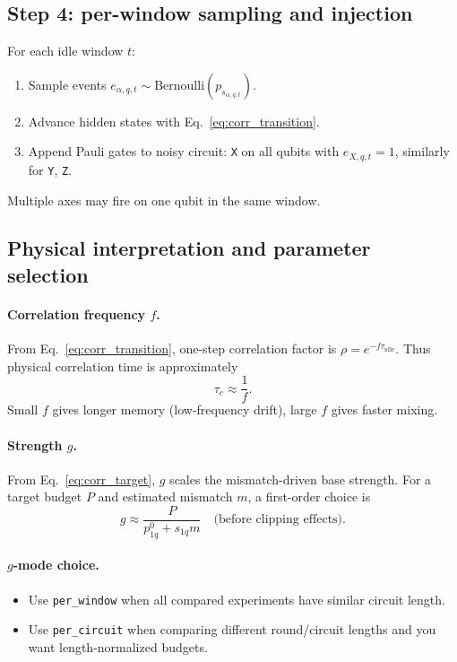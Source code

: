 \documentclass[11pt]{article}
\begin{document}
\subsection{Step 4: per-window sampling and injection}
For each idle window $t$:
\begin{enumerate}[label=\textbf{H\arabic*}.]
\item Sample events
$e_{\alpha,q,t}\sim \mathrm{Bernoulli}(p_{s_{\alpha,q,t}})$.
\item Advance hidden states with Eq.~\eqref{eq:corr_transition}.
\item Append Pauli gates to noisy circuit:
\texttt{X} on all qubits with $e_{X,q,t}=1$, similarly for \texttt{Y}, \texttt{Z}.
\end{enumerate}
Multiple axes may fire on one qubit in the same window.

\subsection{Physical interpretation and parameter selection}
\paragraph{Correlation frequency $f$.}
From Eq.~\eqref{eq:corr_transition}, one-step correlation factor is
$\rho=e^{-f\tau_{\mathrm{idle}}}$.
Thus physical correlation time is approximately
\begin{equation}
\tau_c\approx \frac{1}{f}.
\end{equation}
Small $f$ gives longer memory (low-frequency drift), large $f$ gives faster mixing.

\paragraph{Strength $g$.}
From Eq.~\eqref{eq:corr_target}, $g$ scales the mismatch-driven base strength.
For a target budget $P$ and estimated mismatch $m$, a first-order choice is
\begin{equation}
g \approx \frac{P}{p_{1q}^{0}+s_{1q}m}
\quad
\text{(before clipping effects).}
\end{equation}

\paragraph{$g$-mode choice.}
\begin{itemize}
\item Use \texttt{per\_window} when all compared experiments have similar circuit length.
\item Use \texttt{per\_circuit} when comparing different round/circuit lengths and you want length-normalized budgets.
\end{itemize}
\end{document}
